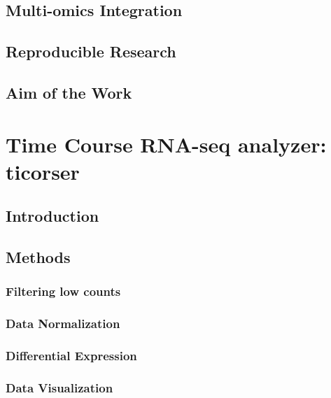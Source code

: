 \documentclass[a4paper, oneside, british, intoc, bibliograph=totoc, index=totoc, BCOR10mm, twoside, openright]{book}
\numberwithin{equation}{section}
\numberwithin{figure}{section}
\begin{document}
\section{Multi-omics Integration} \label{sec:integration}

\section{Reproducible Research} \label{sec:reprres}

\section{Aim of the Work} \label{sec:reprres}



\chapter{Time Course RNA-seq analyzer: ticorser} \label{sec:ticorsercap}

\section{Introduction} \label{sec:ticorseintro}

\section{Methods} \label{sec:ticorseintromethods}

\subsection{Filtering low counts} \label{sec:ticorserfiltering}

\subsection{Data Normalization} \label{sec:ticorsernormalization}

\subsection{Differential Expression} \label{sec:ticorsermethods}

\subsection{Data Visualization} \label{sec:ticorserplots}

\end{document}
